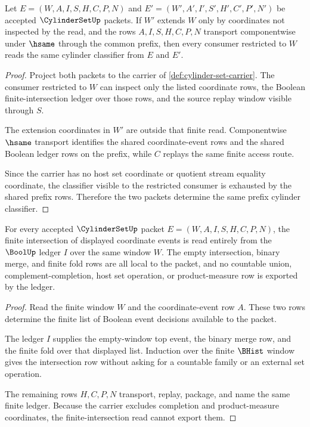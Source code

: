 \begin{theorem}
\label{thm:cylinder-set-prefix-stability}
Let $E=(W,A,I,S,H,C,P,N)$ and $E'=(W',A',I',S',H',C',P',N')$ be accepted $\CylinderSetUp$ packets. If $W'$ extends $W$ only by coordinates not inspected by the read, and the rows $A,I,S,H,C,P,N$ transport componentwise under $\hsame$ through the common prefix, then every consumer restricted to $W$ reads the same cylinder classifier from $E$ and $E'$.
\end{theorem}
\begin{proof}
Project both packets to the carrier of \autoref{def:cylinder-set-carrier}. The consumer restricted to $W$ can inspect only the listed coordinate rows, the Boolean finite-intersection ledger over those rows, and the source replay window visible through $S$.

The extension coordinates in $W'$ are outside that finite read. Componentwise $\hsame$ transport identifies the shared coordinate-event rows and the shared Boolean ledger rows on the prefix, while $C$ replays the same finite access route.

Since the carrier has no host set coordinate or quotient stream equality coordinate, the classifier visible to the restricted consumer is exhausted by the shared prefix rows. Therefore the two packets determine the same prefix cylinder classifier.
\end{proof}

\begin{theorem}
\label{thm:cylinder-set-finite-intersection-ledger}
For every accepted $\CylinderSetUp$ packet $E=(W,A,I,S,H,C,P,N)$, the finite intersection of displayed coordinate events is read entirely from the $\BoolUp$ ledger $I$ over the same window $W$. The empty intersection, binary merge, and finite fold rows are all local to the packet, and no countable union, complement-completion, host set operation, or product-measure row is exported by the ledger.
\end{theorem}
\begin{proof}
Read the finite window $W$ and the coordinate-event row $A$. These two rows determine the finite list of Boolean event decisions available to the packet.

The ledger $I$ supplies the empty-window top event, the binary merge row, and the finite fold over that displayed list. Induction over the finite $\BHist$ window gives the intersection row without asking for a countable family or an external set operation.

The remaining rows $H,C,P,N$ transport, replay, package, and name the same finite ledger. Because the carrier excludes completion and product-measure coordinates, the finite-intersection read cannot export them.
\end{proof}

